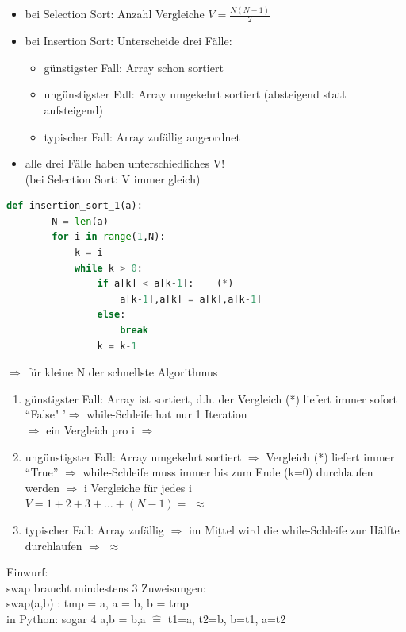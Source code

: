 \documentclass[11pt, fleqn]{scrreprt}
\begin{document}
	\begin{itemize}
		\item bei Selection Sort: Anzahl Vergleiche $V = \frac{N(N-1)}{2}$
		\item bei Insertion Sort: Unterscheide drei Fälle:
		\begin{itemize}
			\item günstigster Fall: Array schon sortiert
			\item ungünstigster Fall: Array umgekehrt sortiert (absteigend statt aufsteigend)
			\item typischer Fall: Array zufällig angeordnet
		\end{itemize}
		\item alle drei Fälle haben unterschiedliches V! \\
		(bei Selection Sort: V immer gleich)
		
	\end{itemize}
	
	\begin{lstlisting}[language=Python]
	def insertion_sort_1(a):
		N = len(a)
		for i in range(1,N):
			k = i
			while k > 0:
				if a[k] < a[k-1]:    (*)
					a[k-1],a[k] = a[k],a[k-1]
				else:
					break
				k = k-1
	\end{lstlisting}
	
	$\Rightarrow$ für kleine N der schnellste Algorithmus \\
	\vspace*{-5mm}
	\begin{enumerate}
		\item günstigster Fall: Array ist sortiert, d.h. der Vergleich (*) liefert immer sofort ``False" '$\Rightarrow$ while-Schleife hat nur 1 Iteration \\
		$\Rightarrow$ ein Vergleich pro i $\Rightarrow$ 
		\item ungünstigster Fall: Array umgekehrt sortiert $\Rightarrow$ Vergleich (*) liefert immer ``True'' $\Rightarrow$ while-Schleife muss immer bis zum Ende (k=0) durchlaufen werden $\Rightarrow$ i Vergleiche für jedes i \\
		$V=1+2+3+...+(N-1)=$  $\approx$ 
		\item typischer Fall: Array zufällig $\Rightarrow$ im $\underline{\text{Mittel}}$ wird die while-Schleife zur Hälfte durchlaufen $\Rightarrow$  $\approx$ 
	\end{enumerate}
	
	
	Einwurf: \\
	swap braucht mindestens 3 Zuweisungen: \\
	\hspace*{5mm} swap(a,b) : tmp = a, a = b, b = tmp \\
	in Python: sogar 4 a,b = b,a $\widehat{=}$ t1=a, t2=b, b=t1, a=t2
	
\end{document}
